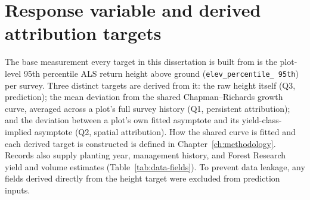 \documentclass[logo,msc,ai]{infthesis}           %
\begin{document}
\section{Response variable and derived attribution targets}

The base measurement every target in this dissertation is built from is the plot-level 95th
percentile ALS return height above ground (\texttt{elev\_\allowbreak percentile\_\allowbreak
95th}) per survey. Three distinct targets are derived from it: the raw height itself (Q3,
prediction); the mean deviation from the shared Chapman--Richards growth curve, averaged across
a plot's full survey history (Q1, persistent attribution); and the deviation between a plot's
own fitted asymptote and its yield-class-implied asymptote (Q2, spatial attribution). How the
shared curve is fitted and each derived target is constructed is defined in
Chapter~\ref{ch:methodology}. Records also supply planting year, management history, and Forest
Research yield and volume estimates (Table~\ref{tab:data-fields}). To prevent data leakage, any
fields derived directly from the height target were excluded from prediction inputs.
\end{document}
